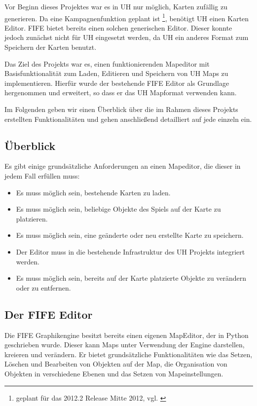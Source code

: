 Vor Beginn dieses Projektes war es in UH nur möglich, Karten zufällig zu
generieren.
Da eine Kampagnenfunktion geplant ist \footnote{geplant für das 2012.2 Release Mitte 2012, vgl.
\cite{roadmap}}, benötigt UH einen Karten Editor. FIFE bietet bereits einen
solchen generischen Editor.
Dieser konnte jedoch zunächst nicht für UH eingesetzt werden, da UH ein
anderes Format zum Speichern der Karten benutzt.

Das Ziel des Projekts war es, einen funktionierenden Mapeditor mit Basisfunktionalität
zum Laden, Editieren und Speichern von UH Maps zu implementieren. Hierfür wurde
der bestehende FIFE Editor als Grundlage hergenommen und erweitert, so dass er das
UH Mapformat verwenden kann.

Im Folgenden geben wir einen Überblick über die im Rahmen dieses Projekts erstellten
Funktionalitäten und gehen anschließend detailliert auf jede einzeln ein.

\subsection{Überblick}
Es gibt einige grundsätzliche Anforderungen an einen Mapeditor, die dieser in jedem
Fall erfüllen muss:

\begin{itemize}
\item Es muss möglich sein, bestehende Karten zu laden.
\item Es muss möglich sein, beliebige Objekte des Spiels auf der Karte zu
platzieren.
\item Es muss möglich sein, eine geänderte oder neu erstellte Karte zu
speichern.
\item Der Editor muss in die bestehende Infrastruktur des UH Projekts integriert
werden.
\item Es muss möglich sein, bereits auf der Karte platzierte Objekte zu verändern oder
zu entfernen.
\end{itemize}

\subsection{Der FIFE Editor}
Die FIFE Graphikengine besitzt bereits einen eigenen MapEditor, der in Python geschrieben
wurde. Dieser kann Maps unter
Verwendung der Engine darstellen, kreieren und verändern. Er bietet grundsätzliche
Funktionalitäten wie das Setzen, Löschen und Bearbeiten von Objekten auf der
Map, die Organisation von Objekten in verschiedene Ebenen und das Setzen von Mapeinstellungen.

